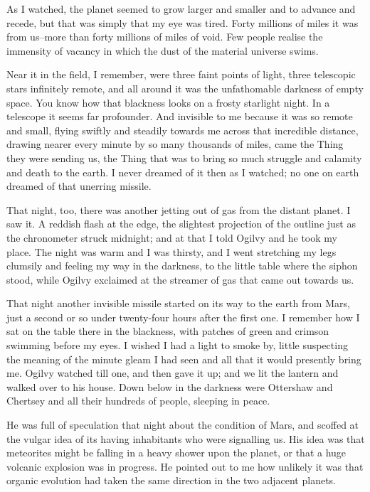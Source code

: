 As I watched, the planet seemed to grow larger and smaller and to
advance and recede, but that was simply that my eye was tired.
Forty millions of miles it was from us--more than forty millions of
miles of void. Few people realise the immensity of vacancy in which
the dust of the material universe swims.

Near it in the field, I remember, were three faint points of light,
three telescopic stars infinitely remote, and all around it was the
unfathomable darkness of empty space. You know how that blackness
looks on a frosty starlight night. In a telescope it seems far
profounder. And invisible to me because it was so remote and small,
flying swiftly and steadily towards me across that incredible
distance, drawing nearer every minute by so many thousands of
miles, came the Thing they were sending us, the Thing that was to
bring so much struggle and calamity and death to the earth. I never
dreamed of it then as I watched; no one on earth dreamed of that
unerring missile.

That night, too, there was another jetting out of gas from the
distant planet. I saw it. A reddish flash at the edge, the
slightest projection of the outline just as the chronometer struck
midnight; and at that I told Ogilvy and he took my place. The night
was warm and I was thirsty, and I went stretching my legs clumsily
and feeling my way in the darkness, to the little table where the
siphon stood, while Ogilvy exclaimed at the streamer of gas that
came out towards us.

That night another invisible missile started on its way to the
earth from Mars, just a second or so under twenty-four hours after
the first one. I remember how I sat on the table there in the
blackness, with patches of green and crimson swimming before my
eyes. I wished I had a light to smoke by, little suspecting the
meaning of the minute gleam I had seen and all that it would
presently bring me. Ogilvy watched till one, and then gave it up;
and we lit the lantern and walked over to his house. Down below in
the darkness were Ottershaw and Chertsey and all their hundreds of
people, sleeping in peace.

He was full of speculation that night about the condition of Mars,
and scoffed at the vulgar idea of its having inhabitants who were
signalling us. His idea was that meteorites might be falling in a
heavy shower upon the planet, or that a huge volcanic explosion was
in progress. He pointed out to me how unlikely it was that organic
evolution had taken the same direction in the two adjacent
planets.

